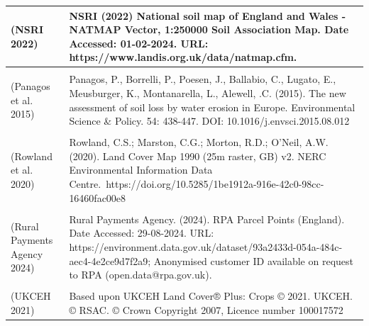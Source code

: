 \documentclass[
  12pt,
  letterpaper,
  DIV=11,
  numbers=noendperiod]{scrartcl}
\begin{document}
\begin{longtable}[t]{>{\raggedright\arraybackslash}p{10em}|>{\raggedright\arraybackslash}p{50em}}
\hline
(NSRI 2022) & NSRI (2022) National soil map of England and Wales - NATMAP Vector, 1:250000 Soil Association Map.  Date Accessed: 01-02-2024. URL: https://www.landis.org.uk/data/natmap.cfm.\\
\hline
\cellcolor{gray!10}{(Ordanance Survey 2024)} & \cellcolor{gray!10}{Ordanance Survey. (2024). OS Open Rivers. Date Accessed: 01-06-2024. URL: https://www.data.gov.uk/dataset/dc29160b-b163-4c6e-8817-f313229bcc23/os-open-rivers}\\
\hline
(Panagos et al. 2015) & Panagos, P., Borrelli, P., Poesen, J., Ballabio, C., Lugato, E., Meusburger, K., Montanarella, L., Alewell, .C. (2015). The new assessment of soil loss by water erosion in Europe. Environmental Science \& Policy. 54: 438-447. DOI: 10.1016/j.envsci.2015.08.012\\
\hline
\cellcolor{gray!10}{(Round 1978)} & \cellcolor{gray!10}{Round, P. D. (1978) An ornithological survey of the Somerset Levels 1976-77. A joint Wessex Water Authority and Royal Society for the Protection of Birds project.}\\
\hline
(Rowland et al. 2020) & Rowland, C.S.; Marston, C.G.; Morton, R.D.; O’Neil, A.W. (2020). Land Cover Map 1990 (25m raster, GB) v2. NERC Environmental Information Data Centre. https://doi.org/10.5285/1be1912a-916e-42c0-98cc-16460fac00e8\\
\hline
\cellcolor{gray!10}{(RSPB 2018)} & \cellcolor{gray!10}{RSPB. (2018). Sustainable Shores habitat creation opportunities WFS. Date Accessed: 01-07-2024. URL: https://opendata-rspb.opendata.arcgis.com/maps/24944d24920a445cb82b724c69715b59/about}\\
\hline
(Rural Payments Agency 2024) & Rural Payments Agency. (2024). RPA Parcel Points (England). Date Accessed: 29-08-2024. URL: https://environment.data.gov.uk/dataset/93a2433d-054a-484c-aec4-4e2ce9d7f2a9; Anonymised customer ID available on request to RPA (open.data@rpa.gov.uk).\\
\hline
\cellcolor{gray!10}{(Somerset Drainage Board Consortium 2011)} & \cellcolor{gray!10}{Somerset Drainage Board Consortium. (2011). Curry Moor Water Level Management Plan. Date Accessed: 29-08-2024. URL: https://somersetdrainageboards.gov.uk/environment/wlmps/}\\
\hline
(UKCEH 2021) & Based upon UKCEH Land Cover® Plus: Crops © 2021. UKCEH. © RSAC. © Crown Copyright 2007, Licence number 100017572\\
\hline

\end{longtable}

\endgroup{}

\newpage{}
\end{document}
